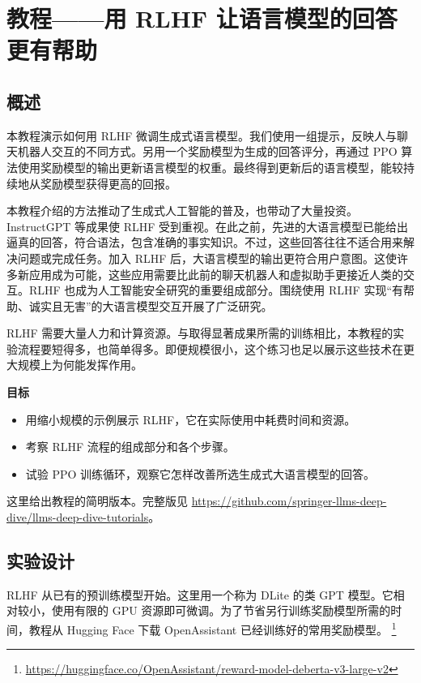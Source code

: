 \section{教程——用 RLHF 让语言模型的回答更有帮助}
\label{sec:ch05-tutorial}
\subsection{概述}
本教程演示如何用 RLHF 微调生成式语言模型。我们使用一组提示，反映人与聊天机器人交互的不同方式。另用一个奖励模型为生成的回答评分，再通过 PPO 算法使用奖励模型的输出更新语言模型的权重。最终得到更新后的语言模型，能较持续地从奖励模型获得更高的回报。


本教程介绍的方法推动了生成式人工智能的普及，也带动了大量投资。InstructGPT 等成果使 RLHF 受到重视。在此之前，先进的大语言模型已能给出逼真的回答，符合语法，包含准确的事实知识。不过，这些回答往往不适合用来解决问题或完成任务。加入 RLHF 后，大语言模型的输出更符合用户意图。这使许多新应用成为可能，这些应用需要比此前的聊天机器人和虚拟助手更接近人类的交互。RLHF 也成为人工智能安全研究的重要组成部分。围绕使用 RLHF 实现“有帮助、诚实且无害”的大语言模型交互开展了广泛研究。

RLHF 需要大量人力和计算资源。与取得显著成果所需的训练相比，本教程的实验流程要短得多，也简单得多。即便规模很小，这个练习也足以展示这些技术在更大规模上为何能发挥作用。

\begin{keypoint}
\noindent\textbf{目标}
\begin{itemize}
\item 用缩小规模的示例展示 RLHF，它在实际使用中耗费时间和资源。
\item 考察 RLHF 流程的组成部分和各个步骤。
\item 试验 PPO 训练循环，观察它怎样改善所选生成式大语言模型的回答。
\end{itemize}
\end{keypoint}

这里给出教程的简明版本。完整版见 \url{https://github.com/springer-llms-deep-dive/llms-deep-dive-tutorials}。

\subsection{实验设计}
RLHF 从已有的预训练模型开始。这里用一个称为 DLite 的类 GPT 模型。它相对较小，使用有限的 GPU 资源即可微调。为了节省另行训练奖励模型所需的时间，教程从 Hugging Face 下载 OpenAssistant 已经训练好的常用奖励模型。%
\footnote{\url{https://huggingface.co/OpenAssistant/reward-model-deberta-v3-large-v2}}

